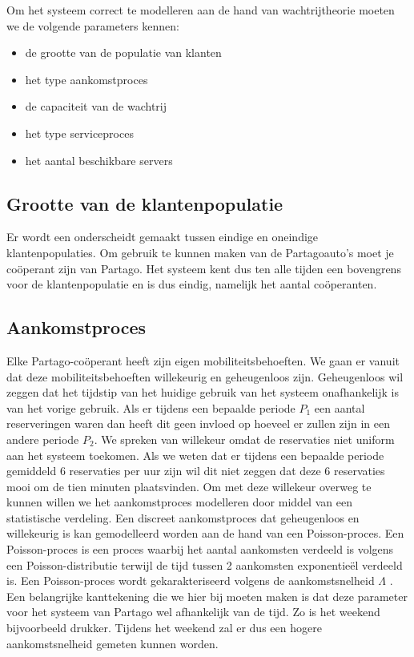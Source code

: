 Om het systeem correct te modelleren aan de hand van wachtrijtheorie moeten we de volgende parameters kennen:
\begin{itemize}
	\item de grootte van de populatie van klanten
	\item het type aankomstproces 
	\item de capaciteit van de wachtrij
	\item het type serviceproces
	\item het aantal beschikbare servers
\end{itemize}

\subsection{Grootte van de klantenpopulatie}
Er wordt een onderscheidt gemaakt tussen eindige en oneindige klantenpopulaties. Om gebruik te kunnen maken van de Partagoauto's moet je coöperant zijn van Partago. Het systeem kent dus ten alle tijden een bovengrens voor de klantenpopulatie en is dus eindig, namelijk het aantal coöperanten.

\subsection{Aankomstproces}
Elke Partago-coöperant heeft zijn eigen mobiliteitsbehoeften. We gaan er vanuit dat deze mobiliteitsbehoeften willekeurig en geheugenloos zijn. Geheugenloos wil zeggen dat het tijdstip van het huidige gebruik van het systeem onafhankelijk is van het vorige gebruik. Als er tijdens een bepaalde periode  $P_{1}$ een aantal reserveringen waren dan heeft dit geen invloed op hoeveel er zullen zijn in een andere periode $P_{2}$. We spreken van willekeur omdat de reservaties niet uniform aan het systeem toekomen. Als we weten dat er tijdens een bepaalde periode gemiddeld 6 reservaties per uur zijn wil dit niet zeggen dat deze 6 reservaties mooi om de tien minuten plaatsvinden. Om met deze willekeur overweg te kunnen willen we het aankomstproces modelleren door middel van een statistische verdeling. Een discreet aankomstproces dat geheugenloos en willekeurig is kan gemodelleerd worden aan de hand van een Poisson-proces. Een Poisson-proces is een proces waarbij het aantal aankomsten verdeeld is volgens een Poisson-distributie terwijl de tijd tussen 2 aankomsten exponentieël verdeeld is. Een Poisson-proces wordt gekarakteriseerd volgens de aankomstsnelheid $\Lambda$ \autocite{liu}. Een belangrijke kanttekening die we hier bij moeten maken is dat deze parameter voor het systeem van Partago wel afhankelijk van de tijd. Zo is het weekend bijvoorbeeld drukker. Tijdens het weekend zal er dus een hogere aankomstsnelheid gemeten kunnen worden. \autocite{van-buggenhout}

